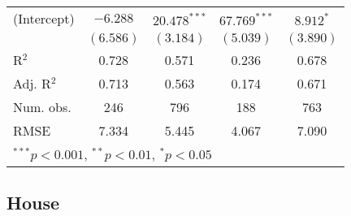 \documentclass[12pt]{article}
\begin{document}
\begin{table}
\begin{center}
\begin{tabular}{l c c c c }
			(Intercept)            & $-6.288$       & $20.478^{***}$ & $67.769^{***}$ & $8.912^{*}$   \\
			& $(6.586)$      & $(3.184)$      & $(5.039)$      & $(3.890)$     \\
			\hline
			R$^2$                  & 0.728          & 0.571          & 0.236          & 0.678         \\
			Adj. R$^2$             & 0.713          & 0.563          & 0.174          & 0.671         \\
			Num. obs.              & 246            & 796            & 188            & 763           \\
			RMSE                   & 7.334          & 5.445          & 4.067          & 7.090         \\
			\hline
			\multicolumn{5}{l}{\scriptsize{$^{***}p<0.001$, $^{**}p<0.01$, $^*p<0.05$}}
		\end{tabular}
	\end{center}
\end{table}

\subsection{House}
\end{document}
